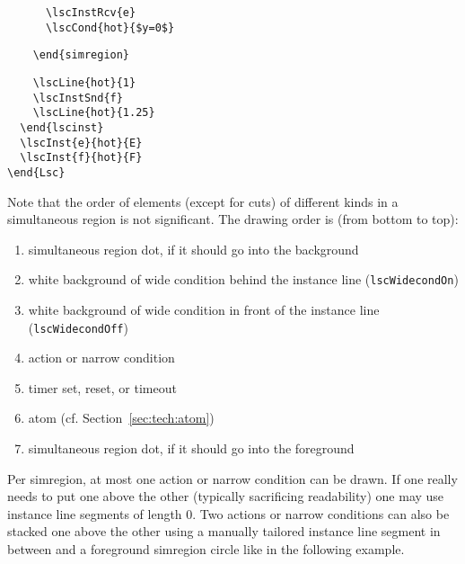 \documentclass{article}
\newcommand{\bs}{\usebox{\bsbox}}
\newcommand{\cmd}[1]{\bs\texttt{#1}}
\newcommand{\mlscWidecondOff}{\cmd{lscWidecondOff}}
\newcommand{\mlscWidecondOn}{\cmd{lscWidecondOn}}
\begin{document}
\begin{center}
\begin{minipage}{0.36\textwidth}
\verbunskip%
{\gray\begin{verbatim}
      \lscInstRcv{e}
      \lscCond{hot}{$y=0$}
\end{verbatim}}%
\verbunskip%
{\begin{verbatim}
    \end{simregion}
\end{verbatim}}%
\verbunskip%
{\begin{verbatim}
    \lscLine{hot}{1}
    \lscInstSnd{f}
    \lscLine{hot}{1.25}
  \end{lscinst}
  \lscInst{e}{hot}{E}
  \lscInst{f}{hot}{F}
\end{Lsc}
\end{verbatim}}%
\end{minipage}
\end{center}%>@>

Note that the order of elements (except for cuts) of different kinds in a
simultaneous region is not significant.
%
The 
drawing order is (from bottom to top):
%
\begin{enumerate}
\item
  simultaneous region dot, if it should go into the background
\item
  white background of 
  wide condition behind the instance line
  (\mlscWidecondOn{})
\item
  white background of 
  wide condition in front of the instance line
  (\mlscWidecondOff{})
\item
  action or 
  narrow condition
\item
  timer set, 
  reset, or 
  timeout
\item
  atom (cf. Section~\ref{sec:tech:atom})
\item
  simultaneous region dot, if it should go into the foreground
\end{enumerate}

Per simregion, at most one action or narrow condition can be drawn.  If one
really needs to put one above the other (typically sacrificing readability)
one may use instance line segments of length 0.  Two actions or narrow
conditions can also be stacked one above the other using a manually tailored
instance line segment in between and a foreground simregion circle like in the
following example.
\end{document}
